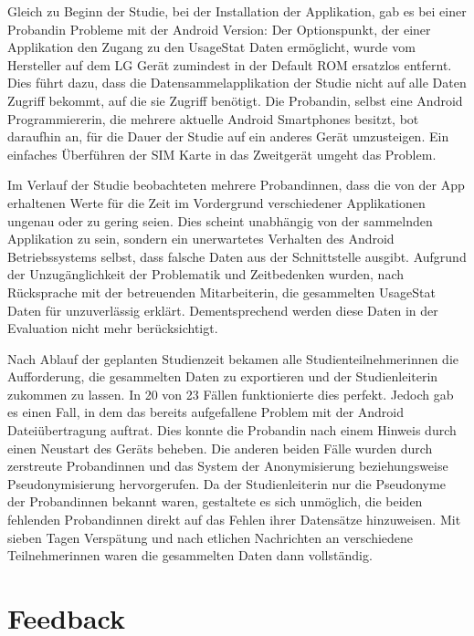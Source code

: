 Gleich zu Beginn der Studie, bei der Installation der Applikation, gab es bei einer Probandin Probleme mit der Android Version:
Der Optionspunkt, der einer Applikation den Zugang zu den UsageStat Daten ermöglicht, wurde vom Hersteller auf dem LG Gerät zumindest in der Default ROM ersatzlos entfernt.
Dies führt dazu, dass die Datensammelapplikation der Studie nicht auf alle Daten Zugriff bekommt, auf die sie Zugriff benötigt.
Die Probandin, selbst eine Android Programmiererin, die mehrere aktuelle Android Smartphones besitzt, bot daraufhin an, für die Dauer der Studie auf ein anderes Gerät umzusteigen.
Ein einfaches Überführen der SIM Karte in das Zweitgerät umgeht das Problem.
\par
Im Verlauf der Studie beobachteten mehrere Probandinnen,  dass die von der App erhaltenen Werte für die Zeit im Vordergrund verschiedener Applikationen ungenau oder zu gering seien.
Dies scheint unabhängig von der sammelnden Applikation zu sein, sondern ein unerwartetes Verhalten des Android Betriebssystems selbst, dass falsche Daten aus der Schnittstelle ausgibt.
Aufgrund der Unzugänglichkeit der Problematik und Zeitbedenken wurden, nach Rücksprache mit der betreuenden Mitarbeiterin, die gesammelten UsageStat Daten für unzuverlässig erklärt.
Dementsprechend werden diese Daten in der Evaluation nicht mehr berücksichtigt.
\par
Nach Ablauf der geplanten Studienzeit bekamen alle Studienteilnehmerinnen die Aufforderung, die gesammelten Daten zu exportieren und der Studienleiterin zukommen zu lassen. 
In 20 von 23 Fällen funktionierte dies perfekt.
Jedoch gab es einen Fall, in dem das bereits aufgefallene Problem \cite{androidbug} mit der Android Dateiübertragung auftrat.
Dies konnte die Probandin nach einem Hinweis durch einen Neustart des Geräts beheben.
Die anderen beiden Fälle wurden durch zerstreute Probandinnen und das System der Anonymisierung beziehungsweise Pseudonymisierung hervorgerufen.
Da der Studienleiterin nur die Pseudonyme der Probandinnen bekannt waren, gestaltete es sich unmöglich, die beiden fehlenden Probandinnen direkt auf das Fehlen ihrer Datensätze hinzuweisen.
Mit sieben Tagen Verspätung und nach etlichen Nachrichten an verschiedene Teilnehmerinnen waren die gesammelten Daten dann vollständig.

\section{Feedback}
\label{feedback}

